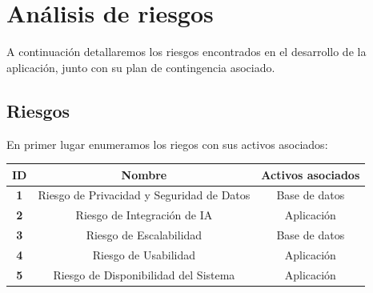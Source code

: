 \documentclass[a4paper,12pt]{article}
\begin{document}
    \section{Análisis de riesgos}
    \par A continuación detallaremos los riesgos encontrados en el desarrollo de la aplicación, junto con su plan de contingencia asociado.
    \subsection{Riesgos}
    \par En primer lugar enumeramos los riegos con sus activos asociados:
    \begin{center}
        \begin{adjustbox}{width=1\textwidth}
            \begin{tabular}{ |c|c|c| }
                \hline
                \rowcolor{lightgray} \textbf{ID} & \textbf{Nombre} & \textbf{Activos asociados} \\
                \hline    
                \textbf{1} & Riesgo de Privacidad y Seguridad de Datos & Base de datos \\
                \hline
                \textbf{2} & Riesgo de Integración de IA & Aplicación \\
                \hline
                \textbf{3} & Riesgo de Escalabilidad & Base de datos \\
                \hline
                \textbf{4} & Riesgo de Usabilidad & Aplicación \\
                \hline
                \textbf{5} & Riesgo de Disponibilidad del Sistema & Aplicación \\
                \hline
            \end{tabular}
        \end{adjustbox}
    \end{center}
\end{document}
